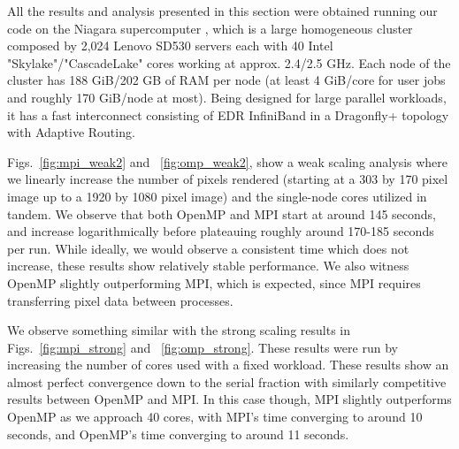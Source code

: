 All the results and analysis presented in this section were obtained
running our code on the Niagara supercomputer \cite{10.1145/3332186.3332195},
which is a large homogeneous cluster composed by 2,024 Lenovo SD530 servers
each with 40 Intel "Skylake"/"CascadeLake" cores working at approx. 2.4/2.5 GHz.
Each node of the cluster has 188 GiB/202 GB of RAM per node (at least 4 GiB/core for user jobs and roughly 170 GiB/node at most).
Being designed for large parallel workloads, it has a fast interconnect consisting of EDR InfiniBand in a Dragonfly+ topology with Adaptive Routing.


Figs.~\ref{fig:mpi_weak2} and ~\ref{fig:omp_weak2}, show a weak scaling analysis where we linearly increase the number of pixels rendered (starting at a 303 by 170 pixel image up to a 1920 by 1080 pixel image) and the single-node cores utilized in tandem. We observe that both OpenMP and MPI start at around 145 seconds, and increase logarithmically before plateauing roughly around 170-185 seconds per run. While ideally, we would observe a consistent time which does not increase, these results show relatively stable performance. We also witness OpenMP slightly outperforming MPI, which is expected, since MPI requires transferring pixel data between processes. 

We observe something similar with the strong scaling results in Figs.~\ref{fig:mpi_strong} and ~\ref{fig:omp_strong}. These results were run by increasing the number of cores used with a fixed workload. These results show an almost perfect convergence down to the serial fraction with similarly competitive results between OpenMP and MPI. In this case though, MPI slightly outperforms OpenMP as we approach 40 cores, with MPI's time converging to around 10 seconds, and OpenMP's time converging to around 11 seconds.


